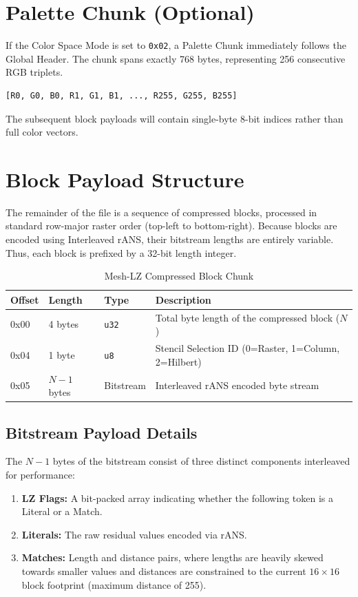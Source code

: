 \section{Palette Chunk (Optional)}
If the Color Space Mode is set to \texttt{0x02}, a Palette Chunk immediately follows the Global Header. The chunk spans exactly 768 bytes, representing 256 consecutive RGB triplets.
\begin{verbatim}
[R0, G0, B0, R1, G1, B1, ..., R255, G255, B255]
\end{verbatim}
The subsequent block payloads will contain single-byte 8-bit indices rather than full color vectors.

\section{Block Payload Structure}
The remainder of the file is a sequence of compressed blocks, processed in standard row-major raster order (top-left to bottom-right). Because blocks are encoded using Interleaved rANS, their bitstream lengths are entirely variable. Thus, each block is prefixed by a 32-bit length integer.

\begin{table}[h!]
\centering
\begin{tabular}{|l|l|l|l|}
\hline
\textbf{Offset} & \textbf{Length} & \textbf{Type} & \textbf{Description} \\
\hline
0x00 & 4 bytes & \texttt{u32} & Total byte length of the compressed block ($N$) \\
0x04 & 1 byte & \texttt{u8} & Stencil Selection ID (0=Raster, 1=Column, 2=Hilbert) \\
0x05 & $N-1$ bytes & Bitstream & Interleaved rANS encoded byte stream \\
\hline
\end{tabular}
\caption{Mesh-LZ Compressed Block Chunk}
\end{table}

\subsection{Bitstream Payload Details}
The $N-1$ bytes of the bitstream consist of three distinct components interleaved for performance:
\begin{enumerate}
    \item \textbf{LZ Flags:} A bit-packed array indicating whether the following token is a Literal or a Match.
    \item \textbf{Literals:} The raw residual values encoded via rANS.
    \item \textbf{Matches:} Length and distance pairs, where lengths are heavily skewed towards smaller values and distances are constrained to the current $16 \times 16$ block footprint (maximum distance of 255).
\end{enumerate}

